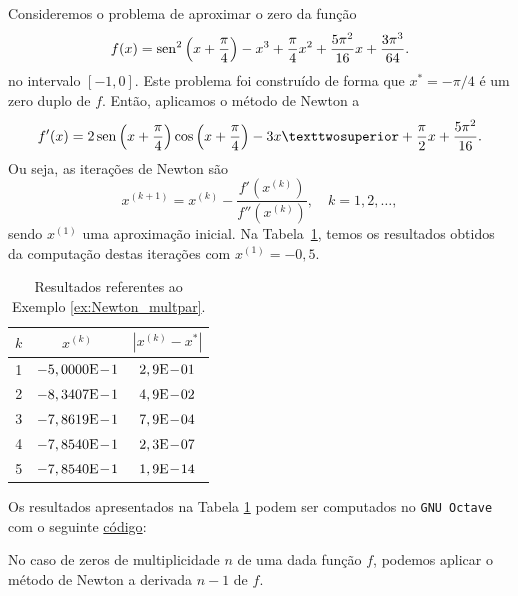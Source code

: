 \begin{ex}\label{ex:Newton_multpar}
  Consideremos o problema de aproximar o zero da função
  \begin{equation}
    f(x) = \operatorname{sen}^2\left(x+\frac{\pi}{4}\right) - x^3 + \frac{\pi}{4}x^2 + \frac{5\pi^2}{16}x + \frac{3\pi^3}{64}.
  \end{equation}
  no intervalo $[-1,0]$. Este problema foi construído de forma que $x^* = -\pi/4$ é um zero duplo de $f$. Então, aplicamos o método de Newton a
  \begin{equation}
    f'(x) = 2\sen\left(x+\frac{\pi}{4}\right)\cos\left(x+\frac{\pi}{4}\right) -3x² +\frac{\pi}{2}x+\frac{5\pi^2}{16}.
  \end{equation}
Ou seja, as iterações de Newton são
\begin{equation}
  x^{(k+1)} = x^{(k)} - \frac{f'(x^{(k)})}{f''(x^{(k)})},\quad k=1,2,\ldots,
\end{equation}
sendo $x^{(1)}$ uma aproximação inicial. Na Tabela~\ref{tab:ex_Newton_multpar}, temos os resultados obtidos da computação destas iterações com $x^{(1)}=-0,5$.

\begin{table}[h!]
  \centering
  \caption{Resultados referentes ao Exemplo \ref{ex:Newton_multpar}.}
  \label{tab:ex_Newton_multpar}
  \begin{tabular}{r|cc}
    $k$ & $x^{(k)}$ & $|x^{(k)}-x^*|$ \\\hline
    1 & $-5,0000\mathrm{E}\!-\!1$ & $2,9\mathrm{E}\!-\!01$ \\
    2 & $-8,3407\mathrm{E}\!-\!1$ & $4,9\mathrm{E}\!-\!02$ \\
    3 & $-7,8619\mathrm{E}\!-\!1$ & $7,9\mathrm{E}\!-\!04$ \\
    4 & $-7,8540\mathrm{E}\!-\!1$ & $2,3\mathrm{E}\!-\!07$ \\
    5 & $-7,8540\mathrm{E}\!-\!1$ & $1,9\mathrm{E}\!-\!14$ \\\hline
  \end{tabular}
\end{table}

\ifisoctave
Os resultados apresentados na Tabela \ref{tab:ex_Newton_multpar} podem ser computados no \verb+GNU Octave+ com o seguinte \href{https://github.com/phkonzen/notas/blob/master/src/MatematicaNumerica/cap_eq1d/dados/ex_Newton_multpar/ex_Newton_multpar.m}{código}:

\fi
\end{ex}

\begin{obs}
  No caso de zeros de multiplicidade $n$ de uma dada função $f$, podemos aplicar o método de Newton a derivada $n-1$ de $f$.
\end{obs}

